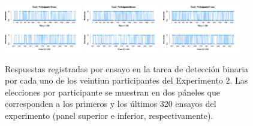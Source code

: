 \begin{figure}[th]
\includegraphics[width=0.30\textwidth]{Figures/Response_Exp2_P19} \includegraphics[width=0.30\textwidth]{Figures/Response_Exp2_P20} \includegraphics[width=0.30\textwidth]{Figures/Response_Exp2_P21} 
\caption[Respuesta binaria registrada ensayo a ensayo; Experimento 2]{Respuestas registradas por ensayo en la tarea de detección binaria por cada uno de los veintiun participantes del Experimento 2. Las elecciones por participante se muestran en dos páneles que corresponden a los primeros y los últimos 320 ensayos del experimento (panel superior e inferior, respectivamente).}
\label{fig:Response_E2}
\end{figure}

